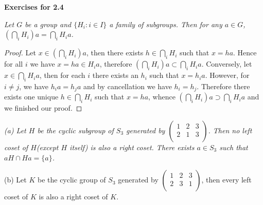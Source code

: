 \begin{center}
\begin{large}
    \textbf{Exercises for 2.4}
\end{large}
\end{center}
\begin{problem}\em
Let $G$ be a group and $\{H_i:i\in I\}$ a family of subgroups. Then for any $a\in G$, $\left(\bigcap_{i}H_i\right)a=\bigcap_iH_ia$.
\end{problem}
\begin{proof}
Let $x\in\left(\bigcap_{i}H_i\right)a$, then there exists $h\in\bigcap_iH_i$ such that $x=ha$. Hence for all $i$ we have $x=ha\in H_ia$, therefore $\left(\bigcap_{i}H_i\right)a\subset\bigcap_iH_ia$. Conversely, let $x\in\bigcap_iH_ia$, then for each $i$ there exists an $h_i$ such that $x=h_ia$. However, for $i\ne j$, we have $h_ia=h_ja$ and by cancellation we have $h_i=h_j$. Therefore there exists one unique $h\in\bigcap_iH_i$ such that $x=ha$, whence $\left(\bigcap_{i}H_i\right)a\supset\bigcap_iH_ia$ and we finished our proof.
\end{proof}
\begin{problem}\em
(a) Let $H$ be the cyclic subgroup of $S_3$ generated by $
\left( \begin{matrix}
	1&		2&		3\\
	2&		1&		3\\
\end{matrix} \right) 
$. Then no left coset of $H$(except $H$ itself) is also a right coset. There exists $a\in S_3$ such that $aH\cap Ha=\{a\}$.\par
(b) Let $K$ be the cyclic group of $S_3$ generated by $
\left( \begin{matrix}
	1&		2&		3\\
	2&		3&		1\\
\end{matrix} \right) 
$, then every left coset of $K$ is also a right coset of $K$.
\end{problem}

